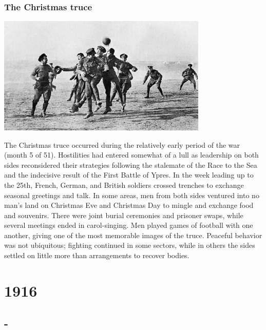 \documentclass[11pt]{report}
\begin{document}
\subsection{The Christmas truce}
\vspace{2mm}\begin{center}\includegraphics[width=10cm]{./img/christmasTruce.jpg}\end{center}
The Christmas truce occurred during the relatively early period of the war (month 5 of 51). Hostilities had entered somewhat of a lull as leadership on both sides reconsidered their strategies following the stalemate of the Race to the Sea and the indecisive result of the First Battle of Ypres. In the week leading up to the 25th, French, German, and British soldiers crossed trenches to exchange seasonal greetings and talk. In some areas, men from both sides ventured into no man's land on Christmas Eve and Christmas Day to mingle and exchange food and souvenirs. There were joint burial ceremonies and prisoner swaps, while several meetings ended in carol-singing. Men played games of football with one another, giving one of the most memorable images of the truce. Peaceful behavior was not ubiquitous; fighting continued in some sectors, while in others the sides settled on little more than arrangements to recover bodies.

\chapter{1916}
\section{-}
\end{document}

